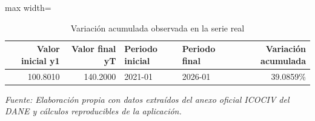 \begin{table}[H]
\centering
\caption{Variación acumulada observada en la serie real}
\label{tab:ejemplo_variacion_acumulada_vias_urbanas}
\scriptsize
\begin{adjustbox}{max width=\linewidth}
\begin{tabular}{rrllr}
\toprule
Valor inicial y1 & Valor final yT & Periodo inicial & Periodo final & Variación acumulada \\
\midrule
100.8010 & 140.2000 & 2021-01 & 2026-01 & 39.0859\% \\
\bottomrule
\end{tabular}
\end{adjustbox}
\par\footnotesize\textit{Fuente: Elaboración propia con datos extraídos del anexo oficial ICOCIV del DANE y cálculos reproducibles de la aplicación.}
\end{table}
